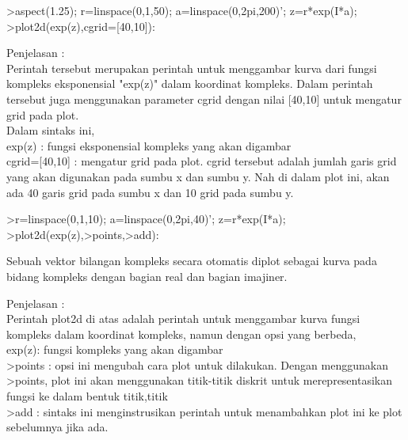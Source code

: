 \documentclass[a4paper,10pt]{article}
\begin{document}
\begin{eulernotebook}
\begin{eulercomment}
\begin{eulercomment}
\begin{eulercomment}
\begin{eulercomment}
\begin{eulercomment}
\begin{eulercomment}
\begin{eulerprompt}
>aspect(1.25); r=linspace(0,1,50); a=linspace(0,2pi,200)'; z=r*exp(I*a);
>plot2d(exp(z),cgrid=[40,10]):
\end{eulerprompt}
\begin{eulercomment}
Penjelasan :\\
Perintah tersebut merupakan perintah untuk menggambar kurva dari
fungsi kompleks eksponensial "exp(z)" dalam koordinat kompleks. Dalam
perintah tersebut juga menggunakan parameter cgrid dengan nilai
[40,10] untuk mengatur grid pada plot.\\
Dalam sintaks ini,\\
exp(z) : fungsi eksponensial kompleks yang akan digambar\\
cgrid=[40,10] : mengatur grid pada plot. cgrid tersebut adalah jumlah
garis grid yang akan digunakan pada sumbu x dan sumbu y. Nah di dalam
plot ini, akan ada 40 garis grid pada sumbu x dan 10 grid pada sumbu
y.

\begin{eulercomment}
\begin{eulerprompt}
>r=linspace(0,1,10); a=linspace(0,2pi,40)'; z=r*exp(I*a);
>plot2d(exp(z),>points,>add):
\end{eulerprompt}
\begin{eulercomment}
Sebuah vektor bilangan kompleks secara otomatis diplot sebagai kurva
pada bidang kompleks dengan bagian real dan bagian imajiner.

Penjelasan :\\
Perintah plot2d di atas adalah perintah untuk menggambar kurva fungsi
kompleks dalam koordinat kompleks, namun dengan opsi yang berbeda,\\
exp(z): fungsi kompleks yang akan digambar\\
\textgreater{}points : opsi ini mengubah cara plot untuk dilakukan. Dengan
menggunakan \textgreater{}points, plot ini akan menggunakan titik-titik diskrit
untuk merepresentasikan fungsi ke dalam bentuk titik,titik\\
\textgreater{}add    : sintaks ini menginstrusikan perintah untuk menambahkan plot
ini ke plot sebelumnya jika ada.


\end{eulercomment}
\end{eulercomment}
\end{eulercomment}
\end{eulercomment}
\end{eulercomment}
\end{eulercomment}
\end{eulercomment}
\end{eulercomment}
\end{eulercomment}
\end{eulernotebook}
\end{document}
